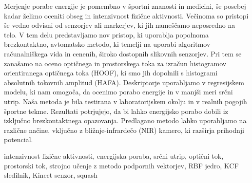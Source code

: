 \povzetekp
Merjenje porabe energije je pomembno v športni znanosti in medicini, še posebej kadar želimo oceniti obseg in intenzivnost fizične aktivnosti. Večinoma so pristopi še vedno odvisni od senzorjev ali markerjev, ki jih nameščamo neposredno na telo. V tem delu predstavljamo nov pristop, ki uporablja popolnoma brezkontaktno, avtomatsko metodo, ki temelji na uporabi algoritmov računalniškega vida in cenenih, široko dostopnih slikovnih senzorjev. Pri tem se zanašamo na oceno optičnega in prostorskega toka za izračun histogramov orientiranega optičnega toka (HOOF), ki smo jih dopolnili s histogrami absolutnih tokovnih amplitud (HAFA). Deskriptorje uporabljamo v regresijskem modelu, ki nam omogoča, da ocenimo porabo energije in v manjši meri srčni utrip. Naša metoda je bila testirana v laboratorijskem okolju in v realnih pogojih športne tekme. Rezultati potrjujejo, da bi lahko energijsko porabo dobili iz izključno brezkontaktnega opazovanja. Predlagano metodo lahko uporabljamo na različne načine, vključno z bližnje-infrardečo (NIR) kamero, ki razširja prihodnji potencial.


\kljucnebesede intenzivnost fizične aktivnosti, energijska poraba, srčni utrip, optični tok, prostorski tok, strojno učenje z metodo podpornih vektorjev, RBF jedro, KCF sledilnik, Kinect senzor, squash